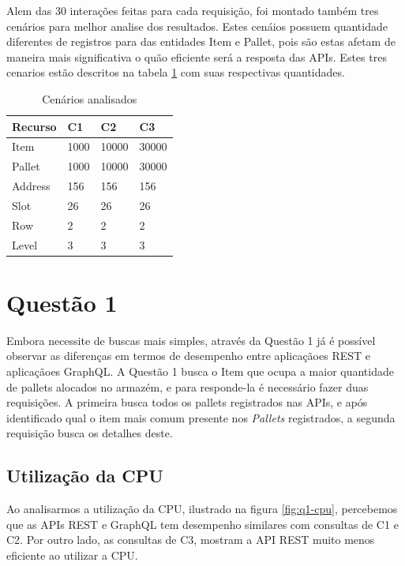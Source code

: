 Alem das 30 interações feitas para cada requisição, foi montado também tres cenários para melhor analise dos resultados. Estes cenáios possuem quantidade diferentes de registros para das entidades Item e Pallet, pois são estas afetam de maneira mais significativa o quão eficiente será a resposta das APIs. Estes tres cenarios estão descritos na tabela \ref{tab:cenarios} com suas respectivas quantidades.

\begin{table}[htbp]
    \centering
    \begin{tabular}{| l | l | l | l|}
        \hline
        \textbf{Recurso} & \textbf{C1} & \textbf{C2} & \textbf{C3} \\ \hline
        Item & 1000 & 10000 & 30000 \\ \hline
        Pallet & 1000 & 10000 & 30000 \\ \hline
        Address & 156 & 156 & 156 \\ \hline
        Slot & 26 & 26 & 26 \\ \hline
        Row & 2 & 2 & 2 \\ \hline
        Level & 3 & 3 & 3 \\ \hline
    \end{tabular}
    \caption{Cenários analisados} 
    \label{tab:cenarios}
\end{table}

\section{Questão 1}

Embora necessite de buscas mais simples, através da Questão 1 já é possível observar as diferenças em termos de desempenho entre aplicaçãoes REST e aplicaçãoes GraphQL. A Questão 1 busca o Item que ocupa a maior quantidade de pallets alocados no armazém, e para responde-la é necessário fazer duas requisições. A primeira busca todos os pallets registrados nas APIs, e após identificado qual o item mais comum presente nos \textit{Pallets} registrados, a segunda requisição busca os detalhes deste.

\subsection{Utilização da CPU}

Ao analisarmos a utilização da CPU, ilustrado na figura \ref{fig:q1-cpu}, percebemos que as APIs REST e GraphQL tem desempenho similares com consultas de C1 e C2. Por outro lado, as consultas de C3, mostram a API REST muito menos eficiente ao utilizar a CPU.

